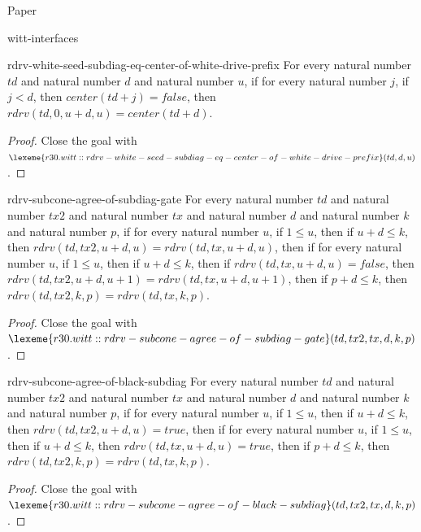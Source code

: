 \begin{lexlean}{Paper}
\begin{section}{witt-interfaces}
  \begin{theorem}{rdrv-white-seed-subdiag-eq-center-of-white-drive-prefix}
  For every natural number \(td\) and natural number \(d\) and natural number \(u\), if for every natural number \(j\), if \(j < d\), then \(center(td + j) = false\), then \(rdrv(td, 0, u + d, u) = center(td + d)\).
  \begin{proof}
  Close the goal with \(\lexeme{r30.witt::rdrv-white-seed-subdiag-eq-center-of-white-drive-prefix}(td, d, u)\).
  \end{proof}
  \end{theorem}

  \begin{theorem}{rdrv-subcone-agree-of-subdiag-gate}
  For every natural number \(td\) and natural number \(tx2\) and natural number \(tx\) and natural number \(d\) and natural number \(k\) and natural number \(p\), if for every natural number \(u\), if \(1 ≤ u\), then if \(u + d ≤ k\), then \(rdrv(td, tx2, u + d, u) = rdrv(td, tx, u + d, u)\), then if for every natural number \(u\), if \(1 ≤ u\), then if \(u + d ≤ k\), then if \(rdrv(td, tx, u + d, u) = false\), then \(rdrv(td, tx2, u + d, u + 1) = rdrv(td, tx, u + d, u + 1)\), then if \(p + d ≤ k\), then \(rdrv(td, tx2, k, p) = rdrv(td, tx, k, p)\).
  \begin{proof}
  Close the goal with \(\lexeme{r30.witt::rdrv-subcone-agree-of-subdiag-gate}(td, tx2, tx, d, k, p)\).
  \end{proof}
  \end{theorem}

  \begin{theorem}{rdrv-subcone-agree-of-black-subdiag}
  For every natural number \(td\) and natural number \(tx2\) and natural number \(tx\) and natural number \(d\) and natural number \(k\) and natural number \(p\), if for every natural number \(u\), if \(1 ≤ u\), then if \(u + d ≤ k\), then \(rdrv(td, tx2, u + d, u) = true\), then if for every natural number \(u\), if \(1 ≤ u\), then if \(u + d ≤ k\), then \(rdrv(td, tx, u + d, u) = true\), then if \(p + d ≤ k\), then \(rdrv(td, tx2, k, p) = rdrv(td, tx, k, p)\).
  \begin{proof}
  Close the goal with \(\lexeme{r30.witt::rdrv-subcone-agree-of-black-subdiag}(td, tx2, tx, d, k, p)\).
  \end{proof}
  \end{theorem}


\end{section}
\end{lexlean}
